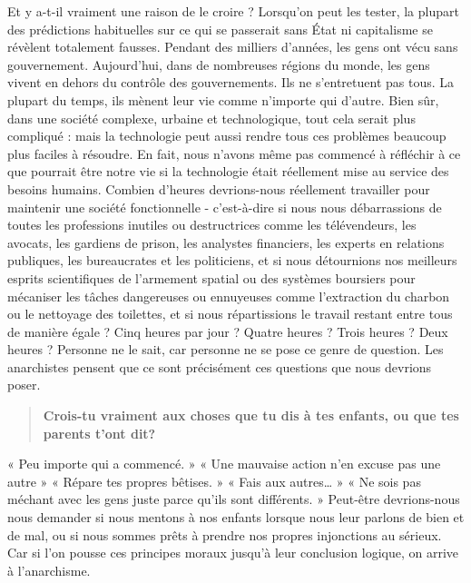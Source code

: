 Et y a-t-il vraiment une raison de le croire ? Lorsqu'on peut les tester, la plupart des prédictions habituelles sur ce qui se passerait sans État ni capitalisme se révèlent totalement fausses. Pendant des milliers d'années, les gens ont vécu sans gouvernement. Aujourd'hui, dans de nombreuses régions du monde, les gens vivent en dehors du contrôle des gouvernements. Ils ne s'entretuent pas tous. La plupart du temps, ils mènent leur vie comme n'importe qui d'autre. Bien sûr, dans une société complexe, urbaine et technologique, tout cela serait plus compliqué : mais la technologie peut aussi rendre tous ces problèmes beaucoup plus faciles à résoudre. En fait, nous n'avons même pas commencé à réfléchir à ce que pourrait être notre vie si la technologie était réellement mise au service des besoins humains. Combien d'heures devrions-nous réellement travailler pour maintenir une société fonctionnelle - c'est-à-dire si nous nous débarrassions de toutes les professions inutiles ou destructrices comme les télévendeurs, les avocats, les gardiens de prison, les analystes financiers, les experts en relations publiques, les bureaucrates et les politiciens, et si nous détournions nos meilleurs esprits scientifiques de l'armement spatial ou des systèmes boursiers pour mécaniser les tâches dangereuses ou ennuyeuses comme l'extraction du charbon ou le nettoyage des toilettes, et si nous répartissions le travail restant entre tous de manière égale ? Cinq heures par jour ? Quatre heures ? Trois heures ? Deux heures ? Personne ne le sait, car personne ne se pose ce genre de question. Les anarchistes pensent que ce sont précisément ces questions que nous devrions poser.

\begin{quotation}
\textbf{Crois-tu vraiment aux choses que tu dis à tes enfants, ou que tes parents t’ont dit?}
\end{quotation}

« Peu importe qui a commencé. » « Une mauvaise action n'en excuse pas une autre » « Répare tes propres bêtises. » « Fais aux autres… » « Ne sois pas méchant avec les gens juste parce qu'ils sont différents. » Peut-être devrions-nous nous demander si nous mentons à nos enfants lorsque nous leur parlons de bien et de mal, ou si nous sommes prêts à prendre nos propres injonctions au sérieux. Car si l'on pousse ces principes moraux jusqu'à leur conclusion logique, on arrive à l'anarchisme.

